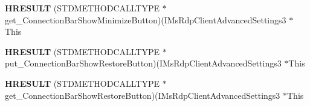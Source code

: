 \begin{DoxyCompactItemize}
{\bfseries H\+R\+E\+S\+U\+LT} (S\+T\+D\+M\+E\+T\+H\+O\+D\+C\+A\+L\+L\+T\+Y\+PE $\ast$get\+\_\+\+Connection\+Bar\+Show\+Minimize\+Button)(I\+Ms\+Rdp\+Client\+Advanced\+Settings3 $\ast$This
\item 
\mbox{\label{struct_i_ms_rdp_client_advanced_settings3_vtbl_a7b19ac736afe07528f86a78b442e7e1b}} 
{\bfseries H\+R\+E\+S\+U\+LT} (S\+T\+D\+M\+E\+T\+H\+O\+D\+C\+A\+L\+L\+T\+Y\+PE $\ast$put\+\_\+\+Connection\+Bar\+Show\+Restore\+Button)(I\+Ms\+Rdp\+Client\+Advanced\+Settings3 $\ast$This
\item 
\mbox{\label{struct_i_ms_rdp_client_advanced_settings3_vtbl_a786b685cf8cb44f79349ac8d7de314bb}} 
{\bfseries H\+R\+E\+S\+U\+LT} (S\+T\+D\+M\+E\+T\+H\+O\+D\+C\+A\+L\+L\+T\+Y\+PE $\ast$get\+\_\+\+Connection\+Bar\+Show\+Restore\+Button)(I\+Ms\+Rdp\+Client\+Advanced\+Settings3 $\ast$This
\end{DoxyCompactItemize}
